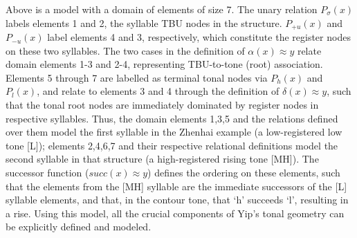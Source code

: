 \documentclass{article}
\newcommand\se{\small+}
\newcommand{\ap}{\approx}
\begin{document}
\begin{center}
\end{center}
Above is a model with a domain of elements of size 7. The unary relation $P_{\sigma}(x)$ labels elements 1 and 2, the syllable TBU nodes in the structure. $P_{+u}(x)$ and $P_{-u}(x)$ label elements 4 and 3, respectively, which constitute the register nodes on these two syllables. The two cases in the definition of $\alpha(x)\ap y$ relate domain elements 1-3 and 2-4, representing TBU-to-tone (root) association. Elements 5 through 7 are labelled as terminal tonal nodes via $P_{h}(x)$ and $P_{l}(x)$, and relate to elements 3 and 4 through the definition of $\delta(x)\ap y$, such that the tonal root nodes are immediately dominated by register nodes in respective syllables. Thus, the domain elements {1,3,5} and the relations defined over them model the first syllable in the Zhenhai example (a low-registered low tone [L]); elements {2,4,6,7} and their respective relational definitions model the second syllable in that structure (a high-registered rising tone [MH]). The successor function ($succ(x)\ap y$) defines the ordering on these elements, such that the elements from the [MH] syllable are the immediate successors of the [L] syllable elements, and that, in the contour tone, that `h' succeeds `l', resulting in a rise. Using this model, all the crucial components of Yip's tonal geometry can be explicitly defined and modeled.\par
\end{document}
